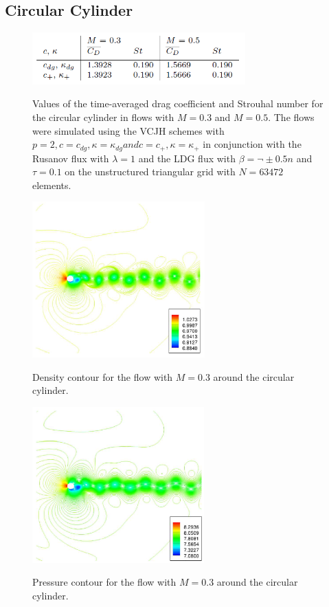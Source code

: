 \graphicspath{{figures_cylinder/}}%


\subsection{Circular Cylinder}
\begin{figure}
\centering
\includegraphics[height=20mm]{table_925} \\
\caption{Values of the time-averaged drag coefficient and Strouhal number for the circular cylinder in flows with $M = 0.3$ and $M = 0.5$. The flows were simulated using the VCJH schemes with $p = 2, c = c_{dg}, \kappa = \kappa_{dg} and c = c_+, \kappa = \kappa_+$ in conjunction with the Rusanov flux with $\lambda = 1$ and the LDG flux with $\beta = ¬±0.5n$ and $\tau = 0.1$ on the unstructured triangular grid with $N = 63472$ elements.}
\label{fig:table_925}
\end{figure}

\begin{figure}
\centering
\includegraphics[height=60mm]{figure_921a} \\
\caption{Density contour for the flow with $M = 0.3$ around the circular cylinder.}
\label{fig:figure_921a}
\end{figure}

\begin{figure}
\centering
\includegraphics[height=60mm]{figure_921b} \\
\caption{Pressure contour for the flow with $M = 0.3$ around the circular cylinder.}
\label{fig:figure_921b}
\end{figure}

